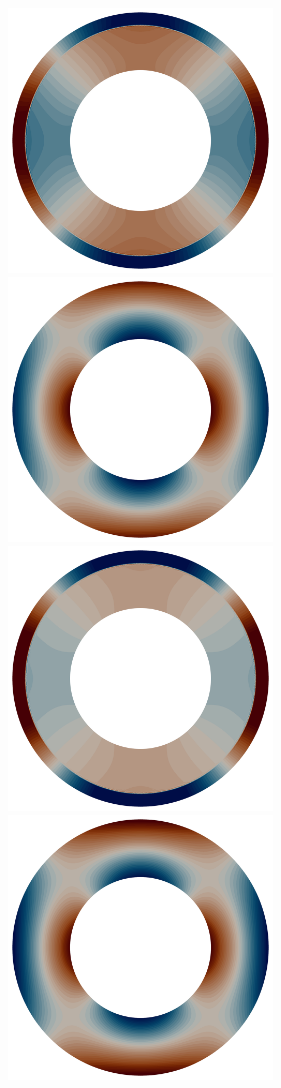 \documentclass[12pt]{article}
\numberwithin{equation}{subsection}
\begin{document}
\begin{figure}[!htb]
	\vspace{-0.3in}
	\begin{multicols}{4}
		\includegraphics[width=7cm]{./case1/p_uw.png}\par
		\hspace{0.75in}
		\includegraphics[width=7cm]{./case2/p_uw.png}\par
		\hspace{1.5in}
		\includegraphics[width=7cm]{./case3/p_uw.png}\par
		\hspace{2.25in}
		\includegraphics[width=7cm]{./case4/p_uw.png}

\end{multicols}
\end{figure}
\end{document}
